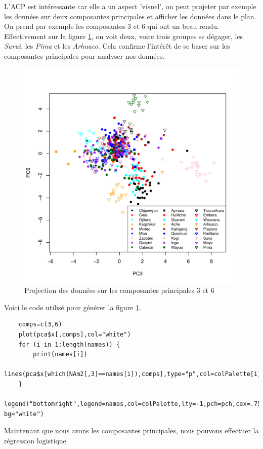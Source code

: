 \documentclass[12pt,a4paper]{article}
\begin{document}
\noindent L'ACP est intéressante car elle a un aspect 'visuel', on peut projeter par
exemple les données sur deux composantes principales et afficher les données
dans le plan. On prend par exemple les composantes 3 et 6 qui ont un beau
rendu. Effectivement sur la figure \ref{fig:acp_pc36}, on voit deux, voire trois
groupes se dégager, les \textit{Surui}, les \textit{Pima} et les \textit{Arhuaco}. Cela confirme l'intérêt
de se baser sur les composantes principales pour analyser nos données.
\begin{figure}[h!]
	\begin{center}
		\includegraphics[scale=0.7]{figures/pc36.pdf}
		\caption{Projection des données sur les composantes principales 3 et 6}
		\label{fig:acp_pc36}
	\end{center}
\end{figure}

Voici le code utilisé pour générer la figure \ref{fig:acp_pc36}.
\begin{lstlisting}
	comps=c(3,6)
	plot(pca$x[,comps],col="white")
	for (i in 1:length(names)) {
		print(names[i])
		lines(pca$x[which(NAm2[,3]==names[i]),comps],type="p",col=colPalette[i],pch=pch[i])
	}
	legend("bottomright",legend=names,col=colPalette,lty=-1,pch=pch,cex=.75,ncol=3,lwd=2, bg="white")
\end{lstlisting}
Maintenant que nous avons les composantes principales, nous
pouvons effectuer la régression logistique.
\end{document}
